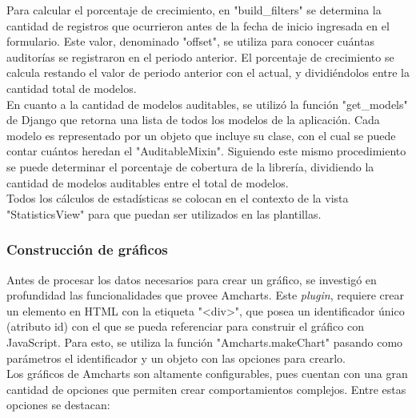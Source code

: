 Para calcular el porcentaje de crecimiento, en "build\_filters" se determina la cantidad de registros que ocurrieron antes de la fecha de inicio ingresada en el formulario. Este valor, denominado "offset", se utiliza para conocer cuántas auditorías se registraron en el periodo anterior. El porcentaje de crecimiento se calcula restando el valor de periodo anterior con el actual, y dividiéndolos entre la cantidad total de modelos.\\

En cuanto a la cantidad de modelos auditables, se utilizó la función "get\_models" de Django que retorna una lista de todos los modelos de la aplicación. Cada modelo es representado por un objeto que incluye su clase, con el cual se puede contar cuántos heredan el "AuditableMixin". Siguiendo este mismo procedimiento se puede determinar el porcentaje de cobertura de la librería, dividiendo la cantidad de modelos auditables entre el total de modelos.\\

Todos los cálculos de estadísticas se colocan en el contexto de la vista "StatisticsView" para que puedan ser utilizados en las plantillas.

\subsubsection{Construcción de gráficos}

Antes de procesar los datos necesarios para crear un gráfico, se investigó en profundidad las funcionalidades que provee Amcharts. Este \textit{plugin}, requiere crear un elemento en HTML con la etiqueta "<div>", que posea un identificador único (atributo id) con el que se pueda referenciar para construir el gráfico con JavaScript. Para esto, se utiliza la función "Amcharts.makeChart" pasando como parámetros el identificador y un objeto con las opciones para crearlo.\\

Los gráficos de Amcharts son altamente configurables, pues cuentan con una gran cantidad de opciones que permiten crear comportamientos complejos. Entre estas opciones se destacan:


